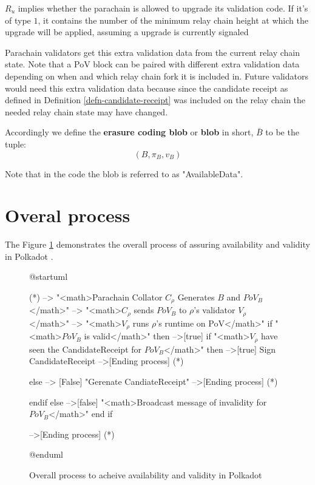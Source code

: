 \begin{definition}
  $R_u$ implies whether the parachain is allowed to upgrade its validation code.
  If it's of type $1$, it contains the number of the minimum relay chain height
  at which the upgrade will be applied, assuming a upgrade is currently signaled
  \newline

  Parachain validators get this extra validation data from the current relay
  chain state. Note that a PoV block can be paired with different extra
  validation data depending on when and which relay chain fork it is included
  in. Future validators would need this extra validation data because since the
  candidate receipt as defined in Definition \ref{defn-candidate-receipt} was
  included on the relay chain the needed relay chain state may have changed.
\end{definition}

\begin{definition}
  \label{defn-blob}
  Accordingly we define the {\bf erasure coding blob} or {\bf blob} in short,
  {\bf $\bar{B}$} to be the tuple:
  \[
  (B, \pi_B, v_B)
  \]
\end{definition}

Note that in the code the blob is referred to as "AvailableData".


\section{Overal process}

The Figure \ref{diag-anv-overall} demonstrates the overall process of assuring
availability and validity in Polkadot .

\begin{figure}[h!]
\label{diag-anv-overall}
\begin{plantuml}
@startuml

(*) --> "<math>Parachain Collator $C_\rho$ Generates  $B$ and $PoV_B$</math>"
    --> "<math>$C_\rho$ sends $PoV_B$ to $\rho$'s validator $V_\rho$</math>"
    --> "<math>$V_{\rho}$ runs $\rho$'s runtime on PoV</math>"
    if "<math>$PoV_B$ is valid</math>" then
    -->[true] if  "<math>$V_{\rho}$ have seen the CandidateReceipt for $PoV_B$</math>" then
    -->[true] Sign CandidateReceipt
    -->[Ending process] (*)

    else
    --> [False] "Gerenate CandiateReceipt"
    -->[Ending process] (*)

    endif
    else
    -->[false] "<math>Broadcast message of invalidity for $PoV_B$</math>"
    end if

  -->[Ending process] (*)

@enduml
\end{plantuml}
\caption{Overall process to acheive availability and validity in Polkadot}
\end{figure}

